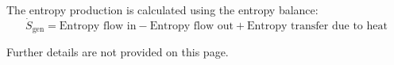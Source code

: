 The entropy production is calculated using the entropy balance:  
\[
\dot{S}_{\text{gen}} = \text{Entropy flow in} - \text{Entropy flow out} + \text{Entropy transfer due to heat}
\]  

Further details are not provided on this page.
